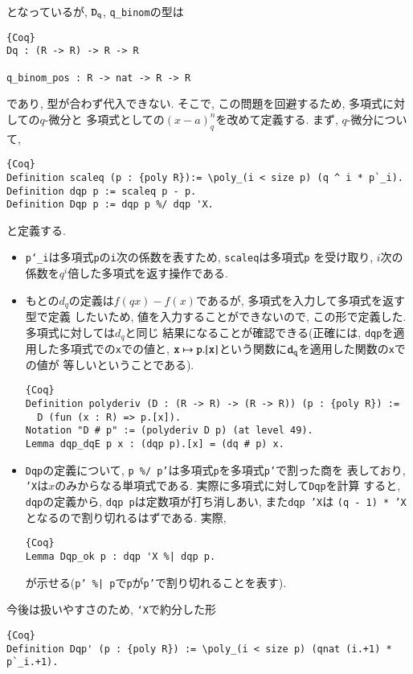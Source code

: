 \documentclass[11pt]{jarticle}
\theoremstyle{mystyle}
\newcommand{\0}{\textbf{0}}
\newcommand{\1}{\textbf{1}}
\newcommand{\2}{\textbf{2}}
\begin{document}
となっているが, ${\tt D}_{\tt q}$, {\tt q\_binom}の型は
\begin{lstlisting}{Coq}
Dq : (R -> R) -> R -> R

q_binom_pos : R -> nat -> R -> R \end{lstlisting}
であり, 型が合わず代入できない. そこで, この問題を回避するため, 多項式に対しての$q$-微分と
多項式としての$(x - a)^n_q$を改めて定義する. まず, $q$-微分について, 
\begin{lstlisting}{Coq}
Definition scaleq (p : {poly R}):= \poly_(i < size p) (q ^ i * p`_i).
Definition dqp p := scaleq p - p.
Definition Dqp p := dqp p %/ dqp 'X.
\end{lstlisting}
と定義する. 
\begin{itemize}
  \item {\tt p`\_i}は多項式{\tt p}の{\tt i}次の係数を表すため, {\tt scaleq}は多項式{\tt p}
    を受け取り, $i$次の係数を$q^i$倍した多項式を返す操作である.
  \item もとの$d_q$の定義は$f(qx) - f(x)$であるが, 多項式を入力して多項式を返す型で定義
    したいため, 値を入力することができないので, この形で定義した. 多項式に対しては$d_q$と同じ
    結果になることが確認できる(正確には, {\tt dqp}を適用した多項式での{\tt x}での値と, 
    ${\tt x} \mapsto {\tt p.[x]}$という関数に${\tt d}_{\tt q}$を適用した関数の{\tt x}での値が
    等しいということである). 
    \begin{lstlisting}{Coq}
Definition polyderiv (D : (R -> R) -> (R -> R)) (p : {poly R}) :=
  D (fun (x : R) => p.[x]).
Notation "D # p" := (polyderiv D p) (at level 49).
Lemma dqp_dqE p x : (dqp p).[x] = (dq # p) x.
    \end{lstlisting}
  \item {\tt Dqp}の定義について, {\tt p \%/ p'}は多項式{\tt p}を多項式{\tt p'}で割った商を
    表しており, {\tt 'X}は$x$のみからなる単項式である. 実際に多項式に対して{\tt Dqp}を計算
    すると, {\tt dqp}の定義から, {\tt dqp p}は定数項が打ち消しあい, また{\tt dqp 'X}は
    {\tt (q - 1) * 'X}となるので割り切れるはずである. 実際, 
    \begin{lstlisting}{Coq}
Lemma Dqp_ok p : dqp 'X %| dqp p.
    \end{lstlisting}
    が示せる({\tt p' \%| p}で{\tt p}が{\tt p'}で割り切れることを表す). 
\end{itemize}
今後は扱いやすさのため, {\tt `X}で約分した形
\begin{lstlisting}{Coq}
Definition Dqp' (p : {poly R}) := \poly_(i < size p) (qnat (i.+1) * p`_i.+1).
\end{lstlisting}
\end{document}
